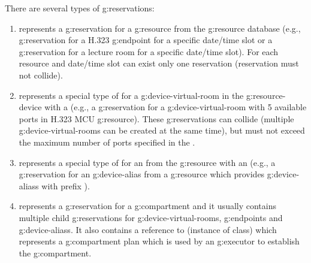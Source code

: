There are several types of \glspl{g:reservation}:
\begin{enumerate}
\item {} represents a \gls{g:reservation} for a \gls{g:resource} from the \gls{g:resource} database (e.g., \gls{g:reservation} for a H.323 \gls{g:endpoint} for a specific date/time slot or a \gls{g:reservation} for a lecture room for a specific date/time slot). For each resource and date/time slot can exist only one reservation (reservation must not collide).
\item {} represents a special type of  for a \gls{g:device-virtual-room} in the \gls{g:resource-device} with a  (e.g., a \gls{g:reservation} for a \gls{g:device-virtual-room} with 5 available ports in H.323 MCU \gls{g:resource}). These \glspl{g:reservation} can collide (multiple \glspl{g:device-virtual-room} can be created at the same time), but must not exceed the maximum number of ports specified in the .

\item {} represents a special type of  for an  from the \gls{g:resource} with an  (e.g., a \gls{g:reservation} for an \gls{g:device-alias}  from a \gls{g:resource} which provides \glspl{g:device-alias} with prefix ).
\item {} represents a \gls{g:reservation} for a \gls{g:compartment} and it usually contains multiple child \glspl{g:reservation} for \glspl{g:device-virtual-room}, \glspl{g:endpoint} and \glspl{g:device-alias}. It also contains a reference to  (instance of  class) which represents a \gls{g:compartment} plan which is used by an \gls{g:executor} to establish the \gls{g:compartment}.
\end{enumerate}


